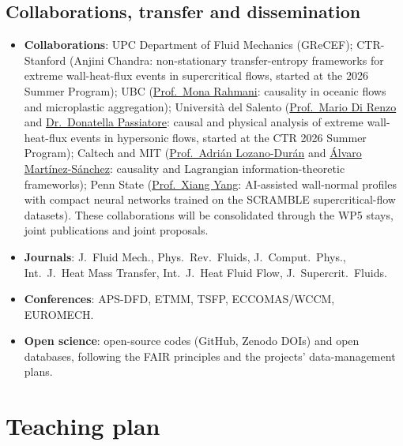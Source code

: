 \documentclass[11pt]{article}
\begin{document}
\subsection{Collaborations, transfer and dissemination}\label{sec:dissemination}
\begin{itemize}
\item \textbf{Collaborations}: UPC Department of Fluid Mechanics (GReCEF); CTR-Stanford (Anjini Chandra: non-stationary transfer-entropy frameworks for extreme wall-heat-flux events in supercritical flows, started at the 2026 Summer Program);
UBC (\href{https://chbe.ubc.ca/mona-rahmani/}{Prof.\ Mona Rahmani}: causality in oceanic flows and microplastic aggregation);
Universit\`a del Salento (\href{https://www.unisalento.it/scheda-utente/-/people/mario.direnzo}{Prof.\ Mario Di Renzo} and \href{https://www.unisalento.it/scheda-utente/-/people/donatella.passiatore}{Dr.\ Donatella Passiatore}: causal and physical analysis of
extreme wall-heat-flux events in hypersonic flows, started at the CTR 2026 Summer Program);
Caltech and MIT (\href{https://www.eas.caltech.edu/people/adrian-lozano-duran}{Prof.\ Adri\'an Lozano-Dur\'an} and \href{https://sites.google.com/view/alvaro-martinez-sanchez/about-me}{\'Alvaro Mart\'inez-S\'anchez}: causality and Lagrangian information-theoretic frameworks); Penn State (\href{https://www.me.psu.edu/department/directory-detail-g.aspx?q=xzy48}{Prof.\ Xiang Yang}: AI-assisted wall-normal profiles with compact neural networks trained on the SCRAMBLE supercritical-flow datasets).
These collaborations will be consolidated through the WP5 stays, joint publications and
joint proposals.
\item \textbf{Journals}: J.\ Fluid Mech., Phys.\ Rev.\ Fluids, J.\ Comput.\ Phys.,
Int.\ J.\ Heat Mass Transfer, Int.\ J.\ Heat Fluid Flow, J.\ Supercrit.\ Fluids.
\item \textbf{Conferences}: APS-DFD, ETMM, TSFP, ECCOMAS/WCCM, EUROMECH.
\item \textbf{Open science}: open-source codes (GitHub, Zenodo DOIs) and open databases,
following the FAIR principles and the projects' data-management plans.
\end{itemize}

\section{Teaching plan}
\end{document}
